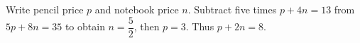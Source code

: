 Write pencil price $p$ and notebook price $n$. Subtract five times $p+4n=13$ from $5p+8n=35$ to obtain $n=\dfrac{5}{2}$, then $p=3$. Thus $p+2n=\boxed8$.
